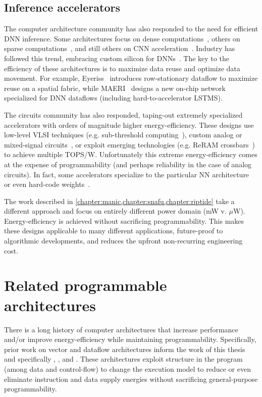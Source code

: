 \subsection{Inference accelerators}
The computer architecture community has also responded to the need for efficient DNN inference.
% 
Some architectures focus on dense computations~\cite{chen:isca16:eyeriss,
chen:asplos14:diannao, chen2014dadiannao}, others on sparse
computations~\cite{han:isca16:eie, du:isca15:shidiannao, maeri,
zhang2016cambricon}, and still others on CNN
acceleration~\cite{alwani2016fused,parashar:isca17:scnn, albericio2016cnvlutin, ding2017circnn, ren2017sc, song2018insitu}.  
%
Industry has followed this trend, embracing custom silicon for
DNNs~\cite{jouppi:isca17:tpu}.
% 
The key to the efficiency of these architectures is to maximize data reuse and
optimize data movement.
% 
For example, Eyeriss~\cite{chen:isca16:eyeriss} introduces row-stationary dataflow to maximize reuse on a spatial fabric, while MAERI~\cite{maeri} designs a new on-chip network specialized for DNN dataflows (including hard-to-accelerator LSTMS).

The circuits community has also responded, taping-out extremely specialized accelerators with orders of magnitude higher energy-efficiency.
%
These designs use low-level VLSI techniques (e.g. sub-threshold computing~\cite{fick2017subthresholdinference}), custom analog or mixed-signal circuits~\cite{bankman2018always}, or exploit emerging technologies (e.g. ReRAM crossbars~\cite{xue201924,xue202015}) to achieve multiple TOPS/W.
% 
Unfortunately this extreme energy-efficiency comes at the expense of programmability (and perhaps reliability in the case of analog circuits).
% 
In fact, some accelerators specialize to the particular NN architecture~\cite{bankman2018always} or even hard-code weights~\cite{something}.

The work described in \autoref{chapter:manic,chapter:snafu,chapter:riptide} take a different approach and focus on entirely different power domain (mW v. $\mu$W).
% 
Energy-efficiency is achieved without sacrificing programmability.
% 
This makes these designs applicable to many different applications, future-proof to algorithmic developments, and reduces the upfront non-recurring engineering cost.

\section{Related programmable architectures}
There is a long history of computer architectures that increase performance and/or improve energy-efficiency while maintaining programmability.
% 
Specifically, prior work on vector and dataflow architectures inform the work of this thesis and specifically \manic, \snafu, and \riptide.
% 
% 
These architectures exploit structure in the program (among data and control-flow) to change the execution model to reduce or even eliminate instruction and data supply energies without sacrificing general-purpose programmability.

